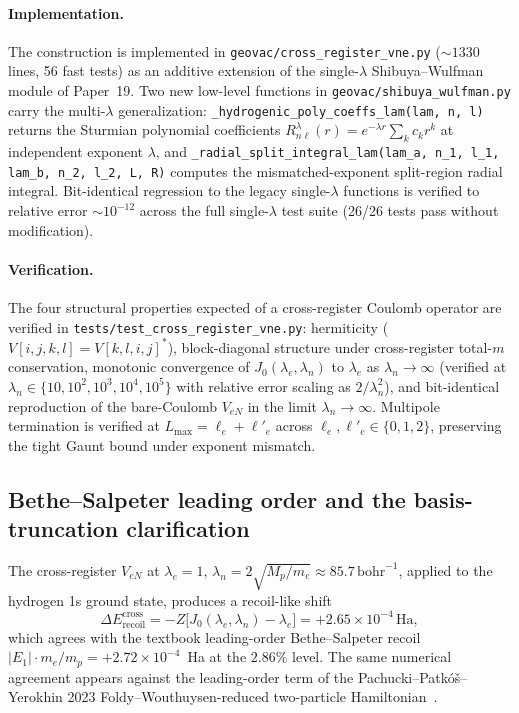 \documentclass[twocolumn,prc,amsmath,amssymb,superscriptaddress]{revtex4-2}
\begin{document}
\paragraph{Implementation.}
The construction is implemented in \texttt{geovac/cross\_register\_vne.py}
($\sim 1330$ lines, 56 fast tests) as an additive extension of the
single-$\lambda$ Shibuya--Wulfman module of Paper~19. Two new low-level
functions in \texttt{geovac/shibuya\_wulfman.py} carry the multi-$\lambda$
generalization: \texttt{\_hydrogenic\_poly\_coeffs\_lam(lam, n, l)}
returns the Sturmian polynomial coefficients
$R^\lambda_{n\ell}(r) = e^{-\lambda r}\sum_k c_k r^k$ at independent
exponent $\lambda$, and
\texttt{\_radial\_split\_integral\_lam(lam\_a, n_1, l_1, lam\_b, n_2,
l_2, L, R)} computes the mismatched-exponent split-region radial
integral. Bit-identical regression to the legacy single-$\lambda$
functions is verified to relative error $\sim 10^{-12}$ across the full
single-$\lambda$ test suite (26/26 tests pass without modification).

\paragraph{Verification.}
The four structural properties expected of a cross-register Coulomb
operator are verified in \texttt{tests/test\_cross\_register\_vne.py}:
hermiticity ($V[i,j,k,l] = V[k,l,i,j]^*$), block-diagonal structure
under cross-register total-$m$ conservation, monotonic convergence of
$J_0(\lambda_e, \lambda_n)$ to $\lambda_e$ as $\lambda_n \to \infty$
(verified at $\lambda_n \in \{10, 10^2, 10^3, 10^4, 10^5\}$ with
relative error scaling as $2/\lambda_n^2$), and bit-identical
reproduction of the bare-Coulomb $V_{eN}$ in the limit
$\lambda_n \to \infty$. Multipole termination is verified at
$L_{\max} = \ell_e + \ell'_e$ across $\ell_e, \ell'_e \in \{0,1,2\}$,
preserving the tight Gaunt bound under exponent mismatch.

\subsection{Bethe--Salpeter leading order and the basis-truncation
clarification}
\label{ssec:cross-bethe}

The cross-register $V_{eN}$ at $\lambda_e = 1$, $\lambda_n =
2\sqrt{M_p / m_e} \approx 85.7\,\mathrm{bohr}^{-1}$, applied to the
hydrogen 1s ground state, produces a recoil-like shift
\begin{equation}
  \Delta E_{\mathrm{recoil}}^{\mathrm{cross}}
  = -Z \big[J_0(\lambda_e, \lambda_n) - \lambda_e\big]
  = +2.65 \times 10^{-4}\,\mathrm{Ha},
\label{eq:recoil-cross}
\end{equation}
which agrees with the textbook leading-order Bethe--Salpeter recoil
$|E_1| \cdot m_e/m_p = +2.72 \times 10^{-4}$~Ha at the
$2.86\%$ level. The same numerical agreement appears against the
leading-order term of the Pachucki--Patkó\v{s}--Yerokhin 2023
Foldy--Wouthuysen-reduced two-particle
Hamiltonian~\cite{Pachucki2023}.
\end{document}
